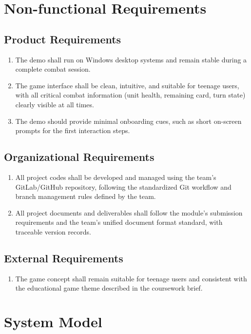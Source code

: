 \documentclass[12pt,a4paper]{report}
\begin{document}
\section{Non-functional Requirements}

\subsection{Product Requirements}

\begin{enumerate}
\item The demo shall run on Windows desktop systems and remain stable during a complete combat session.
\item The game interface shall be clean, intuitive, and suitable for teenage users, with all critical combat information (unit health, remaining card, turn state) clearly visible at all times.
\item The demo should provide minimal onboarding cues, such as short on-screen prompts for the first interaction steps.
\end{enumerate}

\subsection{Organizational Requirements}

\begin{enumerate}
\item All project codes shall be developed and managed using the team's GitLab/GitHub repository, following the standardized Git workflow and branch management rules defined by the team.
\item All project documents and deliverables shall follow the module's submission requirements and the team's unified document format standard, with traceable version records.
\end{enumerate}

\subsection{External Requirements}

\begin{enumerate}
\item The game concept shall remain suitable for teenage users and consistent with the educational game theme described in the coursework brief.
\end{enumerate}

\section{System Model}
\end{document}
